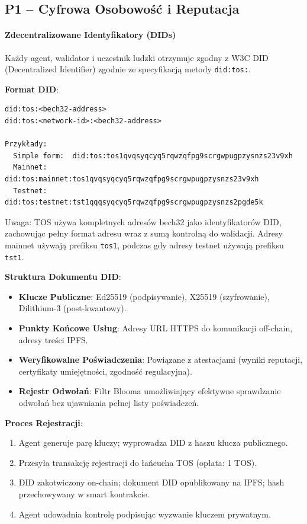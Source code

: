\documentclass[11pt]{article}
\begin{document}
\subsection{P1 -- Cyfrowa Osobowość i Reputacja}
\label{sec:pillar-identity}

\paragraph{Zdecentralizowane Identyfikatory (DIDs)}
Każdy agent, walidator i uczestnik ludzki otrzymuje zgodny z W3C DID (Decentralized Identifier) zgodnie ze specyfikacją metody \texttt{did:tos:}.

\textbf{Format DID}:
\begin{verbatim}
did:tos:<bech32-address>
did:tos:<network-id>:<bech32-address>

Przykłady:
  Simple form:  did:tos:tos1qvqsyqcyq5rqwzqfpg9scrgwpugpzysnzs23v9xh
  Mainnet:      did:tos:mainnet:tos1qvqsyqcyq5rqwzqfpg9scrgwpugpzysnzs23v9xh
  Testnet:      did:tos:testnet:tst1qqqsyqcyq5rqwzqfpg9scrgwpugpzysnzs2pgde5k
\end{verbatim}
Uwaga: TOS używa kompletnych adresów bech32 jako identyfikatorów DID, zachowując pełny format adresu wraz z sumą kontrolną do walidacji. Adresy mainnet używają prefiksu \texttt{tos1}, podczas gdy adresy testnet używają prefiksu \texttt{tst1}.

\textbf{Struktura Dokumentu DID}:
\begin{itemize}[noitemsep]
  \item \textbf{Klucze Publiczne}: Ed25519 (podpisywanie), X25519 (szyfrowanie), Dilithium-3 (post-kwantowy).
  \item \textbf{Punkty Końcowe Usług}: Adresy URL HTTPS do komunikacji off-chain, adresy treści IPFS.
  \item \textbf{Weryfikowalne Poświadczenia}: Powiązane z atestacjami (wyniki reputacji, certyfikaty umiejętności, zgodność regulacyjna).
  \item \textbf{Rejestr Odwołań}: Filtr Blooma umożliwiający efektywne sprawdzanie odwołań bez ujawniania pełnej listy poświadczeń.
\end{itemize}

\textbf{Proces Rejestracji}:
\begin{enumerate}[noitemsep]
  \item Agent generuje parę kluczy; wyprowadza DID z haszu klucza publicznego.
  \item Przesyła transakcję rejestracji do łańcucha TOS (opłata: 1 TOS).
  \item DID zakotwiczony on-chain; dokument DID opublikowany na IPFS; hash przechowywany w smart kontrakcie.
  \item Agent udowadnia kontrolę podpisując wyzwanie kluczem prywatnym.
\end{enumerate}
\end{document}

